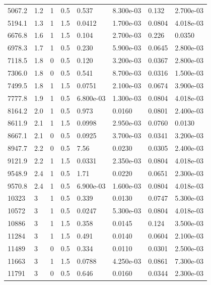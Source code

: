 \documentclass[preview]{standalone}
\begin{document}
{{\begin{tabular}{L{1.2cm}C{1.2cm} C{0.3cm}C{0.5cm} C{1.4cm}C{1.4cm} C{1.4cm}C{1.4cm}}
  5067.2  &   1.2  & 1     & 0.5 &  0.537  & 8.300e-03  & 0.132 &  2.700e-03   \\ 
  5194.1  &   1.3  & 1     & 1.5 &  0.0412  & 1.700e-03  & 0.0804 &  4.018e-03   \\ 
  6676.8  &   1.6  & 1     & 1.5 &  0.104  & 2.700e-03  & 0.226 &  0.0350   \\ 
  6978.3  &   1.7  & 1     & 0.5 &  0.230  & 5.900e-03  & 0.0645 &  2.800e-03   \\ 
  7118.5  &   1.8  & 0     & 0.5 &  0.120  & 3.200e-03  & 0.0367 &  2.800e-03   \\ 
  7306.0  &   1.8  & 0     & 0.5 &  0.541  & 8.700e-03  & 0.0316 &  1.500e-03   \\ 
  7499.5  &   1.8  & 1     & 1.5 &  0.0751  & 2.100e-03  & 0.0674 &  3.900e-03   \\ 
  7777.8  &   1.9  & 1     & 0.5 &  6.800e-03  & 1.300e-03  & 0.0804 &  4.018e-03   \\ 
  8164.2  &   2.0  & 1     & 0.5 &  0.973  & 0.0160  & 0.0801 &  2.400e-03   \\ 
  8611.9  &   2.1  & 1     & 1.5 &  0.0998  & 2.950e-03  & 0.0760 &  0.0130   \\ 
  8667.1  &   2.1  & 0     & 0.5 &  0.0925  & 3.700e-03  & 0.0341 &  3.200e-03   \\ 
  8947.7  &   2.2  & 0     & 0.5 &  7.56  & 0.0230  & 0.0305 &  2.400e-03   \\ 
  9121.9  &   2.2  & 1     & 1.5 &  0.0331  & 2.350e-03  & 0.0804 &  4.018e-03   \\ 
  9548.9  &   2.4  & 1     & 0.5 &  1.71  & 0.0220  & 0.0651 &  2.300e-03   \\ 
  9570.8  &   2.4  & 1     & 0.5 &  6.900e-03  & 1.600e-03  & 0.0804 &  4.018e-03   \\ 
  10323  &     3  & 1     & 0.5 &  0.339  & 0.0130  & 0.0747 &  5.300e-03   \\ 
  10572  &     3  & 1     & 0.5 &  0.0247  & 5.300e-03  & 0.0804 &  4.018e-03   \\ 
  10886  &     3  & 1     & 1.5 &  0.358  & 0.0145  & 0.124 &  3.500e-03   \\ 
  11284  &     3  & 1     & 1.5 &  0.491  & 0.0140  & 0.0604 &  2.100e-03   \\ 
  11489  &     3  & 0     & 0.5 &  0.334  & 0.0110  & 0.0301 &  2.500e-03   \\ 
  11663  &     3  & 1     & 1.5 &  0.0788  & 4.250e-03  & 0.0861 &  7.300e-03   \\ 
  11791  &     3  & 0     & 0.5 &  0.646  & 0.0160  & 0.0344 &  2.300e-03   \\ 

\end{tabular}}}
\end{document}
